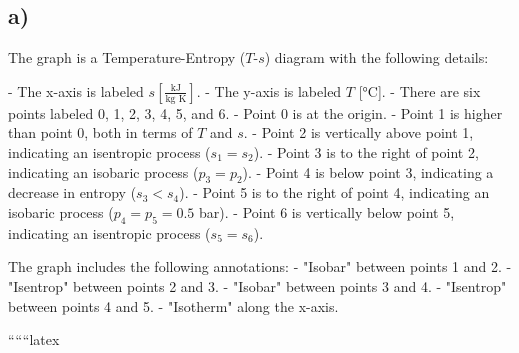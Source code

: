 

\subsection*{a)}

The graph is a Temperature-Entropy ($T$-$s$) diagram with the following details:

- The x-axis is labeled $s \left[ \frac{\text{kJ}}{\text{kg K}} \right]$.
- The y-axis is labeled $T$ [°C].
- There are six points labeled 0, 1, 2, 3, 4, 5, and 6.
- Point 0 is at the origin.
- Point 1 is higher than point 0, both in terms of $T$ and $s$.
- Point 2 is vertically above point 1, indicating an isentropic process ($s_1 = s_2$).
- Point 3 is to the right of point 2, indicating an isobaric process ($p_3 = p_2$).
- Point 4 is below point 3, indicating a decrease in entropy ($s_3 < s_4$).
- Point 5 is to the right of point 4, indicating an isobaric process ($p_4 = p_5 = 0.5$ bar).
- Point 6 is vertically below point 5, indicating an isentropic process ($s_5 = s_6$).

The graph includes the following annotations:
- "Isobar" between points 1 and 2.
- "Isentrop" between points 2 and 3.
- "Isobar" between points 3 and 4.
- "Isentrop" between points 4 and 5.
- "Isotherm" along the x-axis.

``````latex